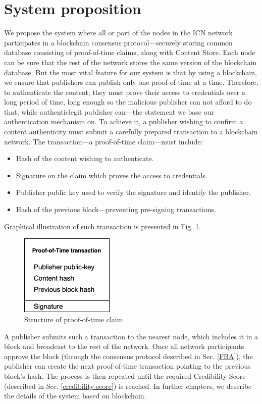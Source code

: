 \section{System proposition}
We propose the system where all or part of the nodes in the ICN network participates in a blockchain consensus protocol––securely storing common database consisting of proof-of-time claims, along with Content Store. Each node can be sure that the rest of the network stores the same version of the blockchain database. But the most vital feature for our system is that by using a blockchain, we ensure that publishers can publish only one proof-of-time at a time. Therefore,  to authenticate the content, they must prove their access to credentials over a long period of time, long enough so the malicious publisher can not afford to do that, while authenticlegit publisher can––the statement we base our authentication mechanism on. To achieve it, a publisher wishing to confirm a content authenticity must submit a carefully prepared transaction to a blockchain network. The transaction––a proof-of-time claim––must include:
\begin{itemize}
    \item Hash of the content wishing to authenticate.
    \item Signature on the claim which proves the access to credentials.
    \item Publisher public key used to verify the signature and identify the publisher.
    \item Hash of the previous block––preventing pre-signing transactions.
\end{itemize}
Graphical illustration of such transaction is presented in Fig. \ref{fig:proof-of-time}.
\begin{figure}[h!]
    \centering
    \includegraphics[width=0.4\textwidth]{img/proof-of-time_transaction.png}
    \caption{Structure of proof-of-time claim}
    \label{fig:proof-of-time}
\end{figure}

A publisher submits such a transaction to the nearest node, which includes it in a block and broadcast to the rest of the network. Once all network participants approve the block (through the consensus protocol described in Sec. \ref{FBA}), the publisher can create the next proof-of-time transaction pointing to the previous block's hash. The process is then repeated until the required Credibility Score (described in Sec. \ref{credibility-score}) is reached. In further chapters, we describe the details of the system based on blockchain.

